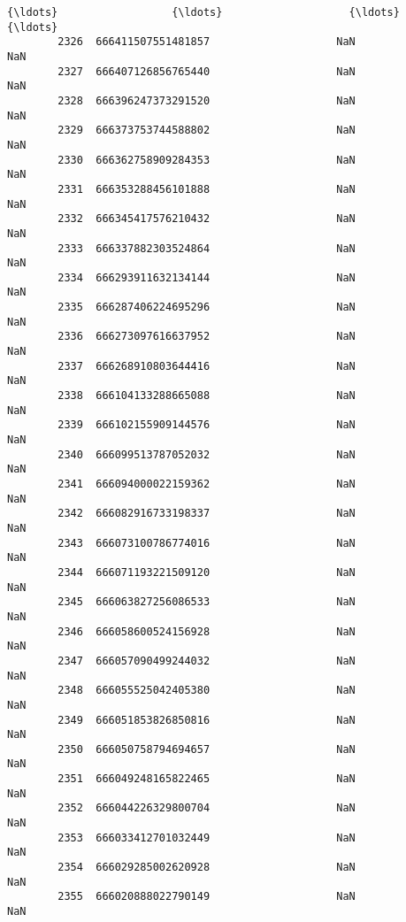\documentclass[11pt]{article}
\begin{document}
\begin{Verbatim}[commandchars=\\\{\}]
        {\ldots}                  {\ldots}                    {\ldots}                  {\ldots}   
        2326  666411507551481857                    NaN                  NaN   
        2327  666407126856765440                    NaN                  NaN   
        2328  666396247373291520                    NaN                  NaN   
        2329  666373753744588802                    NaN                  NaN   
        2330  666362758909284353                    NaN                  NaN   
        2331  666353288456101888                    NaN                  NaN   
        2332  666345417576210432                    NaN                  NaN   
        2333  666337882303524864                    NaN                  NaN   
        2334  666293911632134144                    NaN                  NaN   
        2335  666287406224695296                    NaN                  NaN   
        2336  666273097616637952                    NaN                  NaN   
        2337  666268910803644416                    NaN                  NaN   
        2338  666104133288665088                    NaN                  NaN   
        2339  666102155909144576                    NaN                  NaN   
        2340  666099513787052032                    NaN                  NaN   
        2341  666094000022159362                    NaN                  NaN   
        2342  666082916733198337                    NaN                  NaN   
        2343  666073100786774016                    NaN                  NaN   
        2344  666071193221509120                    NaN                  NaN   
        2345  666063827256086533                    NaN                  NaN   
        2346  666058600524156928                    NaN                  NaN   
        2347  666057090499244032                    NaN                  NaN   
        2348  666055525042405380                    NaN                  NaN   
        2349  666051853826850816                    NaN                  NaN   
        2350  666050758794694657                    NaN                  NaN   
        2351  666049248165822465                    NaN                  NaN   
        2352  666044226329800704                    NaN                  NaN   
        2353  666033412701032449                    NaN                  NaN   
        2354  666029285002620928                    NaN                  NaN   
        2355  666020888022790149                    NaN                  NaN   
        

\end{Verbatim}
\end{document}
